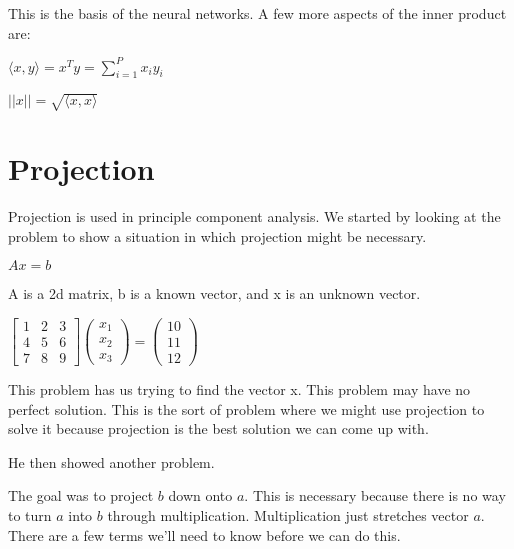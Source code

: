 This is the basis of the neural networks. A few more aspects of the inner product are:

$\langle x,y \rangle = x^T y = \sum_{i=1}^{P}x_i y_i$

$||x|| = \sqrt{\langle x,x \rangle}$


\section{Projection}

Projection is used in principle component analysis. We started by looking at the problem to show a situation in which projection might be necessary.

$Ax=b$

A is a 2d matrix, b is a known vector, and x is an unknown vector.

$\begin{bmatrix}
1 & 2 & 3\\
4 & 5 & 6\\
7 & 8 & 9
\end{bmatrix}
\begin{pmatrix}
x_1\\
x_2\\
x_3
\end{pmatrix}
=
\begin{pmatrix}
10\\
11\\
12
\end{pmatrix}$

This problem has us trying to find the vector x. This problem may have no perfect solution. This is the sort of problem where we might use projection to solve it because projection is the best solution we can come up with.

He then showed another problem.


The goal was to project $b$ down onto $a$. This is necessary because there is no way to turn $a$ into $b$ through multiplication. Multiplication just stretches vector $a$. There are a few terms we'll need to know before we can do this.

